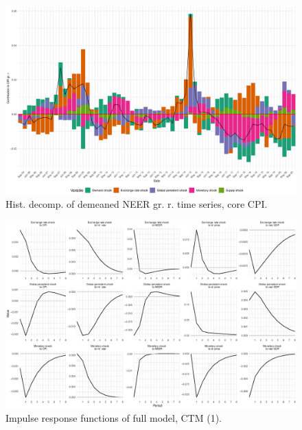 \documentclass{beamer}
\begin{document}
\begin{frame}[noframenumbering]
	\label{corehd}
	\begin{figure}[h!]
		\centering
		\includegraphics[width=1\linewidth]{../Text/figures/hd_core_cpi_full}
		\caption[]{Hist. decomp. of demeaned NEER gr. r. time series, core CPI.}
		\label{fig:hd_cpi_core}
	\end{figure}
\end{frame}

\begin{frame}[noframenumbering]
	\label{fullirfs}
	\begin{figure}[h!]
		\centering
		\includegraphics[width=1\linewidth]{../Text/figures/irf_1}
		\caption[]{Impulse response functions of full model, CTM (1).}
		\label{fig:irf_1}
	\end{figure}
\end{frame}
\end{document}
